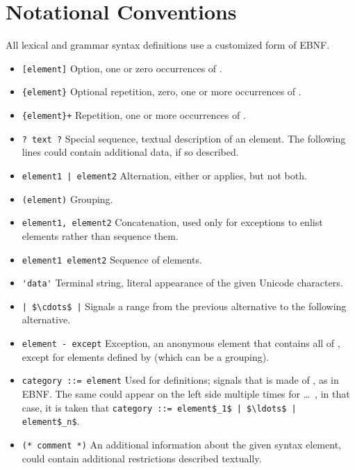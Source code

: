\section{Notational Conventions}

All lexical and grammar syntax definitions use a customized form of EBNF. 

\begin{itemize}
  \item \lstinline![element]! \newline
    Option, one or zero occurrences of . 
  \item \lstinline!{element}! \newline
    Optional repetition, zero, one or more occurrences of .
  \item \lstinline!{element}+! \newline
    Repetition, one or more occurrences of .
  \item \lstinline!? text ?! \newline
    Special sequence, textual description of an element. The following lines could contain additional data, if so described.
  \item \lstinline!element1 | element2! \newline
    Alternation, either  or  applies, but not both. 
  \item \lstinline!(element)! \newline
    Grouping. 
  \item \lstinline!element1, element2! \newline
    Concatenation, used only for exceptions to enlist elements rather than sequence them. 
  \item \lstinline!element1 element2! \newline
    Sequence of elements.
  \item \lstinline!'data'! \newline
    Terminal string, literal appearance of the given Unicode characters. 
  \item \lstinline!| $\cdots$ |! \newline
    Signals a range from the previous alternative to the following alternative. 
  \item \lstinline!element - except! \newline
    Exception, an anonymous element that contains all of , except for elements defined by  (which can be a grouping). 
  \item \lstinline!category ::= element! \newline
    Used for definitions; signals that  is made of , as in EBNF. The same  could appear on the left side multiple times for  \ldots\ , in that case, it is taken that \lstinline!category ::= element$_1$ | $\ldots$ | element$_n$!.
  \item \lstinline!(* comment *)! \newline
    An additional information about the given syntax element, could contain additional restrictions described textually. 
\end{itemize}








